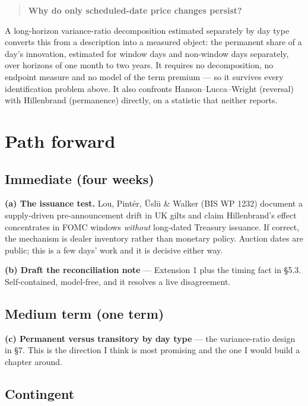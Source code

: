 \documentclass[11pt]{article}
\begin{document}
\begin{quote}
\textbf{Why do only scheduled-date price changes persist?}
\end{quote}

A long-horizon variance-ratio decomposition estimated separately by day type converts this
from a description into a measured object: the permanent share of a day's innovation,
estimated for window days and non-window days separately, over horizons of one month to two
years. It requires no decomposition, no endpoint measure and no model of the term premium ---
so it survives every identification problem above. It also confronts Hanson--Lucca--Wright
(reversal) with Hillenbrand (permanence) directly, on a statistic that neither reports.

\section{Path forward}

\subsection*{Immediate (four weeks)}

\noindent\textbf{(a) The issuance test.} Lou, Pintér, Üslü \& Walker (BIS WP 1232) document a
supply-driven pre-announcement drift in UK gilts and claim Hillenbrand's effect concentrates
in FOMC windows \emph{without} long-dated Treasury issuance. If correct, the mechanism is
dealer inventory rather than monetary policy. Auction dates are public; this is a few days'
work and it is decisive either way.

\noindent\textbf{(b) Draft the reconciliation note} --- Extension 1 plus the timing fact in \S5.3.
Self-contained, model-free, and it resolves a live disagreement.

\subsection*{Medium term (one term)}

\noindent\textbf{(c) Permanent versus transitory by day type} --- the variance-ratio design in \S7.
This is the direction I think is most promising and the one I would build a chapter around.

\subsection*{Contingent}
\end{document}

